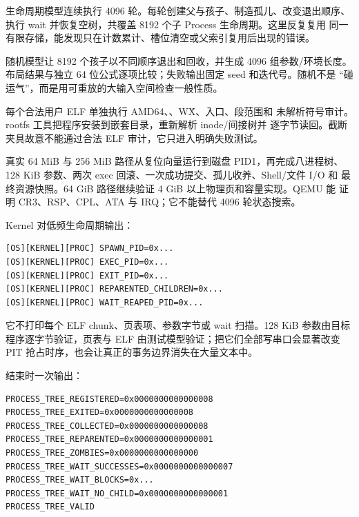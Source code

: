 
生命周期模型连续执行 4096 轮。每轮创建父与孩子、制造孤儿、改变退出顺序、
执行 wait 并恢复空树，共覆盖 8192 个子 Process 生命周期。这里反复复用
同一有限存储，能发现只在计数累计、槽位清空或父索引复用后出现的错误。


随机模型让 8192 个孩子以不同顺序退出和回收，并生成 4096 组参数/环境长度。
布局结果与独立 64 位公式逐项比较；失败输出固定 seed 和迭代号。随机不是
“碰运气”，而是用可重放的大输入空间检查一般性质。


每个合法用户 ELF 单独执行 AMD64、、W\^X、入口、段范围和
未解析符号审计。rootfs 工具把程序安装到嵌套目录，重新解析 inode/间接树并
逐字节读回。截断夹具故意不能通过合法 ELF 审计，它只进入明确失败测试。


真实 64 MiB 与 256 MiB 路径从复位向量运行到磁盘 PID1，再完成八进程树、
128 KiB 参数、两次 exec 回滚、一次成功提交、孤儿收养、Shell/文件 I/O 和
最终资源快照。64 GiB 路径继续验证 4 GiB 以上物理页和容量实现。QEMU 能
证明 CR3、RSP、CPL、ATA 与 IRQ；它不能替代 4096 轮状态搜索。

Kernel 对低频生命周期输出：

\begin{lstlisting}[caption={进程生命周期日志}]
[OS][KERNEL][PROC] SPAWN_PID=0x...
[OS][KERNEL][PROC] EXEC_PID=0x...
[OS][KERNEL][PROC] EXIT_PID=0x...
[OS][KERNEL][PROC] REPARENTED_CHILDREN=0x...
[OS][KERNEL][PROC] WAIT_REAPED_PID=0x...
\end{lstlisting}

它不打印每个 ELF chunk、页表项、参数字节或 wait 扫描。128 KiB 参数由目标
程序逐字节验证，页表与 ELF 由测试模型验证；把它们全部写串口会显著改变 PIT
抢占时序，也会让真正的事务边界消失在大量文本中。

结束时一次输出：

\begin{lstlisting}[caption={正常八进程树的精确摘要}]
PROCESS_TREE_REGISTERED=0x0000000000000008
PROCESS_TREE_EXITED=0x0000000000000008
PROCESS_TREE_COLLECTED=0x0000000000000008
PROCESS_TREE_REPARENTED=0x0000000000000001
PROCESS_TREE_ZOMBIES=0x0000000000000000
PROCESS_TREE_WAIT_SUCCESSES=0x0000000000000007
PROCESS_TREE_WAIT_BLOCKS=0x...
PROCESS_TREE_WAIT_NO_CHILD=0x0000000000000001
PROCESS_TREE_VALID
\end{lstlisting}

